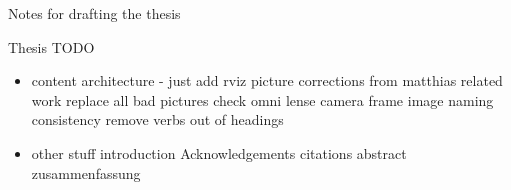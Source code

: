 \clearemptydoublepage

{}

\begin{center}
	\huge{Notes for drafting the thesis}
\end{center}


Thesis TODO
\begin{itemize}
\item content
\subitem architecture - just add rviz picture
\subitem corrections from matthias
\subitem related work
\subitem replace all bad pictures
\subitem check omni lense camera frame image naming consistency
\subitem remove verbs out of headings
\item other stuff
\subitem introduction
\subitem Acknowledgements
\subitem citations
\subitem abstract
\subitem zusammenfassung
\end{itemize}
